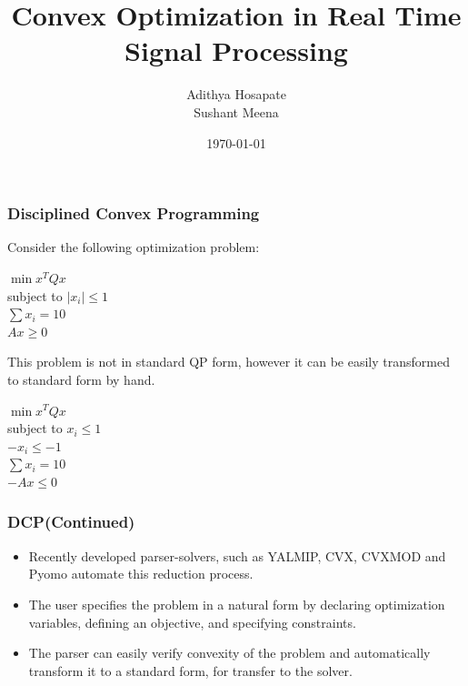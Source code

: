 \documentclass{beamer}
\title[Optimization in Real-Time Signal Processing ]{Convex Optimization in Real Time Signal Processing} %
\author{Adithya Hosapate \\ Sushant Meena} %
\institute[IITH] %
{
IIT Hyderabad \\ %
\medskip
\textit{ee16btech11040@iith.ac.in} %
\medskip \\
\textit{es16btech11021@iith.ac.in}
}
\date{\today} %
\begin{document}
\begin{frame}
\titlepage %
\end{frame}






\begin{frame}
\frametitle{Disciplined Convex Programming}
Consider the following optimization problem:\\
\begin{center}
    $\min x^{T}Qx $\\
    subject to $|x_i|\leq 1 $\\
    $\sum x_{i}=10$\\
    $Ax \geq 0$
\end{center}
This problem is not in standard QP form, however it can be easily transformed to standard form by hand.\\

\begin{center}
    $\min x^{T}Qx $\\
    subject to $x_i\leq 1 $\\
    $-x_i\leq -1 $\\
    $\sum x_{i}=10$\\
    $-Ax \leq 0$
\end{center}



\end{frame}





\begin{frame}

\frametitle{DCP(Continued)}
\begin{itemize}
    \item Recently developed parser-solvers, such as YALMIP, CVX, CVXMOD and Pyomo automate this reduction process.
    \item The user specifies the problem in a natural form by declaring optimization variables, defining an objective, and specifying constraints.
    \item The parser can easily verify convexity of the problem and
automatically transform it to a standard form, for transfer to the solver.
\end{itemize}
\








\end{frame}
\end{document}
